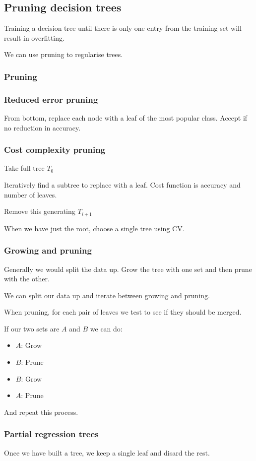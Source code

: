 
\subsection{Pruning decision trees}

Training a decision tree until there is only one entry from the training set will result in overfitting.

We can use pruning to regularise trees.

\subsubsection{Pruning}

\subsubsection{Reduced error pruning}

From bottom, replace each node with a leaf of the most popular class. Accept if no reduction in accuracy.

\subsubsection{Cost complexity pruning}

Take full tree \(T_0\)

Iteratively find a subtree to replace with a leaf. Cost function is accuracy and number of leaves.

Remove this generating \(T_{i+1}\)

When we have just the root, choose a single tree using CV.

\subsubsection{Growing and pruning}

Generally we would split the data up. Grow the tree with one set and then prune with the other.

We can split our data up and iterate between growing and pruning.

When pruning, for each pair of leaves we test to see if they should be merged.

If our two sets are \(A\) and \(B\) we can do:

\begin{itemize}
\item \(A\): Grow
\item \(B\): Prune
\item \(B\): Grow
\item \(A\): Prune
\end{itemize}

And repeat this process.

\subsubsection{Partial regression trees}

Once we have built a tree, we keep a single leaf and disard the rest.


